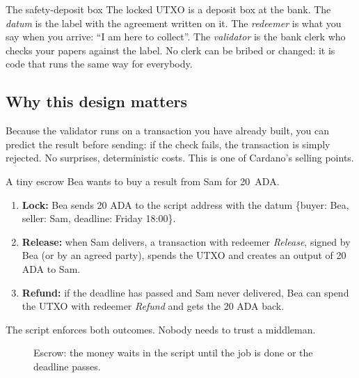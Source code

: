 \begin{analogybox}{The safety-deposit box}
The locked UTXO is a deposit box at the bank. The \emph{datum} is the label with the agreement written on it. The \emph{redeemer} is what you say when you arrive: ``I am here to collect''. The \emph{validator} is the bank clerk who checks your papers against the label. No clerk can be bribed or changed: it is code that runs the same way for everybody.
\end{analogybox}

\subsection{Why this design matters}
Because the validator runs on a transaction you have already built, you can predict the result before sending: if the check fails, the transaction is simply rejected. No surprises, deterministic costs. This is one of Cardano's selling points.

\begin{examplebox}{A tiny escrow}
Bea wants to buy a result from Sam for 20~ADA.
\begin{enumerate}
  \item \textbf{Lock:} Bea sends 20 ADA to the script address with the datum \{buyer: Bea, seller: Sam, deadline: Friday 18:00\}.
  \item \textbf{Release:} when Sam delivers, a transaction with redeemer \emph{Release}, signed by Bea (or by an agreed party), spends the UTXO and creates an output of 20 ADA to Sam.
  \item \textbf{Refund:} if the deadline has passed and Sam never delivered, Bea can spend the UTXO with redeemer \emph{Refund} and gets the 20 ADA back.
\end{enumerate}
The script enforces both outcomes. Nobody needs to trust a middleman.
\end{examplebox}

\begin{figure}[h]
\centering
{}
\caption{Escrow: the money waits in the script until the job is done or the deadline passes.}
\end{figure}

